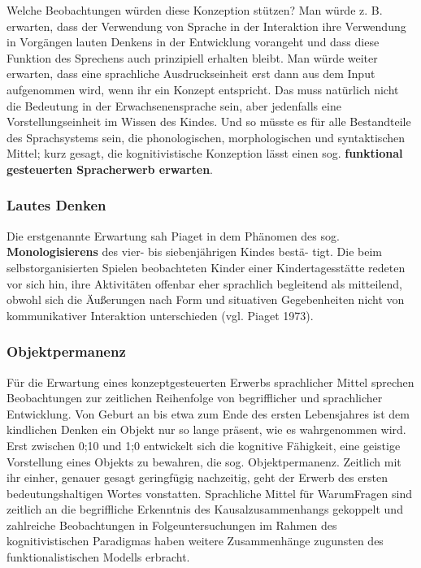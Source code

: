 \documentclass[
  letterpaper,
]{scrbook}
\begin{document}
Welche Beobachtungen würden diese Konzeption stützen? Man würde z. B.
erwarten, dass der Verwendung von Sprache in der Interaktion ihre
Verwendung in Vorgängen lauten Denkens in der Entwicklung vorangeht und
dass diese Funktion des Sprechens auch prinzipiell erhalten bleibt. Man
würde weiter erwarten, dass eine sprachliche Ausdruckseinheit erst dann
aus dem Input aufgenommen wird, wenn ihr ein Konzept entspricht. Das
muss natürlich nicht die Bedeutung in der Erwachsenensprache sein, aber
jedenfalls eine Vorstellungseinheit im Wissen des Kindes. Und so müsste
es für alle Bestandteile des Sprachsystems sein, die phonologischen,
morphologischen und syntaktischen Mittel; kurz gesagt, die
kognitivistische Konzeption lässt einen sog. \textbf{funktional
gesteuerten Spracherwerb erwarten}.

\hypertarget{lautes-denken}{%
\subsubsection{\texorpdfstring{\textbf{Lautes
Denken}}{Lautes Denken}}\label{lautes-denken}}

Die erstgenannte Erwartung sah Piaget in dem Phänomen des sog.
\textbf{Monologisierens} des vier- bis siebenjährigen Kindes bestä-
tigt. Die beim selbstorganisierten Spielen beobachteten Kinder einer
Kindertagesstätte redeten vor sich hin, ihre Aktivitäten offenbar eher
sprachlich begleitend als mitteilend, obwohl sich die Äußerungen nach
Form und situativen Gegebenheiten nicht von kommunikativer Interaktion
unterschieden (vgl. Piaget 1973).

\hypertarget{objektpermanenz}{%
\subsubsection{\texorpdfstring{\textbf{Objektpermanenz}}{Objektpermanenz}}\label{objektpermanenz}}

Für die Erwartung eines konzeptgesteuerten Erwerbs sprachlicher Mittel
sprechen Beobachtungen zur zeitlichen Reihenfolge von begrifflicher und
sprachlicher Entwicklung. Von Geburt an bis etwa zum Ende des ersten
Lebensjahres ist dem kindlichen Denken ein Objekt nur so lange präsent,
wie es wahrgenommen wird. Erst zwischen 0;10 und 1;0 entwickelt sich die
kognitive Fähigkeit, eine geistige Vorstellung eines Objekts zu
bewahren, die sog. Objektpermanenz. Zeitlich mit ihr einher, genauer
gesagt geringfügig nachzeitig, geht der Erwerb des ersten
bedeutungshaltigen Wortes vonstatten. Sprachliche Mittel für WarumFragen
sind zeitlich an die begriffliche Erkenntnis des Kausalzusammenhangs
gekoppelt und zahlreiche Beobachtungen in Folgeuntersuchungen im Rahmen
des kognitivistischen Paradigmas haben weitere Zusammenhänge zugunsten
des funktionalistischen Modells erbracht.
\end{document}
